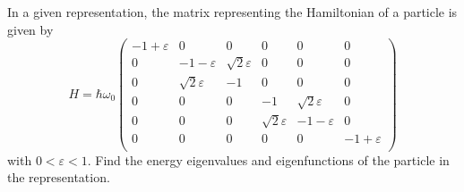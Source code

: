 \documentclass[12pt,a4paper]{article}
\newenvironment{problem}[2][Problem]{\begin{trivlist}
\item[\hskip \labelsep {\bfseries #1}\hskip \labelsep {\bfseries #2.}]}{\end{trivlist}}
\begin{document}
\begin{problem}{1}
In a given representation, the matrix representing the Hamiltonian of a particle is given by
\[
H=\hbar\omega_0\left(\begin{array}{cccccc}
-1+\varepsilon&0&0&0&0&0\\
0&-1-\varepsilon&\sqrt{2}\varepsilon&0&0&0\\
0&\sqrt{2}\varepsilon&-1&0&0&0\\
0&0&0&-1&\sqrt{2}\varepsilon&0\\
0&0&0&\sqrt{2}\varepsilon&-1-\varepsilon&0\\
0&0&0&0&0&-1+\varepsilon\\
\end{array}\right)
\]
with $0<\varepsilon<1$. Find the energy eigenvalues and eigenfunctions of the particle in the representation.
\end{problem}
\end{document}

